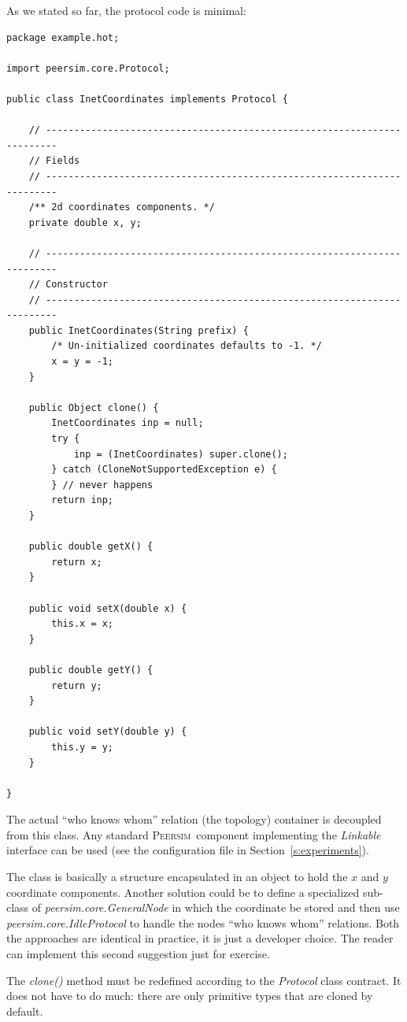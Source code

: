 \documentclass[a4paper,11pt]{article}
\newcommand{\id}[1]{{\scshape\small #1}}
\newcommand{\psim}{\id{Peersim}}
\begin{document}
As we stated so far, the protocol code is minimal:

\footnotesize
\begin{verbatim}
package example.hot;

import peersim.core.Protocol;

public class InetCoordinates implements Protocol {

    // ------------------------------------------------------------------------
    // Fields
    // ------------------------------------------------------------------------
    /** 2d coordinates components. */
    private double x, y;

    // ------------------------------------------------------------------------
    // Constructor
    // ------------------------------------------------------------------------
    public InetCoordinates(String prefix) {
        /* Un-initialized coordinates defaults to -1. */
        x = y = -1;
    }

    public Object clone() {
        InetCoordinates inp = null;
        try {
            inp = (InetCoordinates) super.clone();
        } catch (CloneNotSupportedException e) {
        } // never happens
        return inp;
    }

    public double getX() {
        return x;
    }

    public void setX(double x) {
        this.x = x;
    }

    public double getY() {
        return y;
    }

    public void setY(double y) {
        this.y = y;
    }

}
\end{verbatim}
\normalsize

The actual ``who knows whom'' relation (the topology) container is decoupled
from this class. Any standard \psim~component implementing the
\emph{Linkable} interface can be used (see the configuration file in
Section~\ref{s:experiments}). 

The class is basically a structure encapsulated in an
object to hold the $x$ and $y$ coordinate components. Another solution
could be to define a specialized sub-class of 
\emph{peersim.core.GeneralNode} in which the coordinate be stored
and then use \emph{peersim.core.IdleProtocol} to handle the nodes
``who knows whom'' relations. Both the approaches are identical in
practice, it is just a developer choice. The reader can implement this
second suggestion just for exercise.

The \emph{clone()} method must be redefined according to the
\emph{Protocol} class contract. It does not have to do much: there
are only primitive types that are cloned by default.
\end{document}
